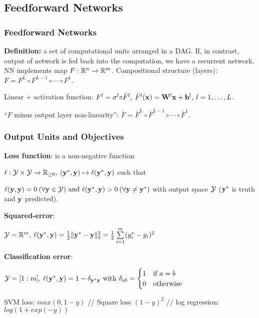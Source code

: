 \subsection{Feedforward Networks}
\label{sub:feedforwardnets}

    \subsubsection{Feedforward Networks}
    \label{ssub:feedforwardnets}
    \textbf{Definition:} a set of computational units arranged in a DAG. If, in contrast, output of network is fed back into the computation, we have a recurrent network.
    NN implements map $F:\mathbb R^n\xrightarrow{}\mathbb R^m$. Compositional structure (layers): $F=F^L{\circ}F^{L-1}\circ\cdots{\circ}F^1$. 
    
    Linear + activation function: $F^l=\sigma^l{\circ}\bar{F}^l, \> \bar{F}^l(\mathbf x)=\mathbf W^l\mathbf x+\mathbf b^l,\> l=1,\ldots,L$. 
    
    ``$F$ minus output layer non-linearity'': $\bar{F}=\bar{F}^L{\circ}\bar{F}^{L-1}\circ\cdots{\circ}\bar{F}^1$.
    
    \subsubsection{Output Units and Objectives}
    \label{ssub:outputunitsobjectives}
    
    \textbf{Loss function}: is a non-negative function 
    
    \tab$\ell:\mathcal{Y}\times\mathcal{Y}\xrightarrow{}\mathbb R_{\geq0},\>(\mathbf y^*,\mathbf y)\mapsto\ell(\mathbf y^*,\mathbf y)$ such that 
    
    \tab$\ell(\mathbf y,\mathbf y)=0\>(\forall\mathbf y\in\mathcal{Y}) \text{ and } \ell(\mathbf y^*,\mathbf y)>0\>(\forall\mathbf y\neq\mathbf y^*)$ with output space $\mathcal{Y}$ ($\mathbf y^*$ is truth and $\mathbf y$ predicted).
    
    \textbf{Squared-error}:
    
    \tab$\mathcal{Y}=\mathbb R^m,\>\ell(\mathbf y^*,\mathbf y)=\frac{1}{2}\lVert\mathbf y^*-\mathbf y\rVert_2^2=\frac{1}{2}\sum\limits_{i=1}^m(y_i^*-y_i)^2$
    
    \textbf{Classification error}:
    
    \tab$\mathcal{Y}=\lbrack1:m\rbrack,\>\ell(\mathbf y^*,\mathbf y)=1-\delta_{\mathbf y^*\mathbf y} \text{ with } \delta_{ab}=\begin{cases}1&\text{if }a=b\\0&\text{otherwise}\end{cases}$
    
    SVM loss: $max(0, 1-y)$ // Square loss $(1-y)^2$ // log regression: $log(1+exp(-y))$
    

